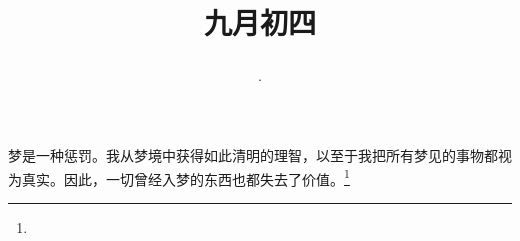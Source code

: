 \title{\date[d=6,m=10,y=2024][year:cn-y,年,month:cn,day:cn,日,·,weekday]·九月初四 }
梦是一种惩罚。我从梦境中获得如此清明的理智，以至于我把所有梦见的事物都视为真实。因此，一切曾经入梦的东西也都失去了价值。\footnote{ }

